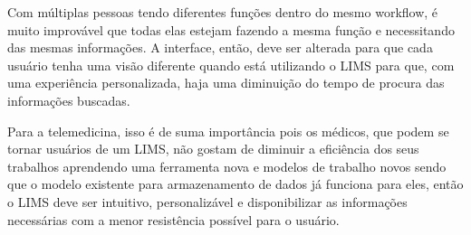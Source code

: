 Com múltiplas pessoas tendo diferentes funções dentro do mesmo workflow, é muito improvável que todas elas estejam fazendo a mesma função e necessitando das mesmas informações. A interface, então, deve ser alterada para que cada usuário tenha uma visão diferente quando está utilizando o LIMS para que, com uma experiência personalizada, haja uma diminuição do tempo de procura das informações buscadas.

Para a telemedicina, isso é de suma importância pois os médicos, que podem se tornar usuários de um LIMS, não gostam de diminuir a eficiência dos seus trabalhos aprendendo uma ferramenta nova e modelos de trabalho novos sendo que o modelo existente para armazenamento de dados já funciona para eles, então o LIMS deve ser intuitivo, personalizável e disponibilizar as informações necessárias com a menor resistência possível para o usuário.